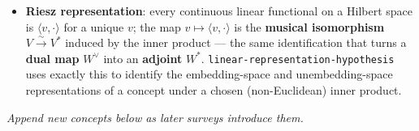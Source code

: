 \begin{itemize}
\item \textbf{Riesz representation}: every continuous linear functional on a Hilbert space is $\langle v,\cdot\rangle$ for a unique $v$; the map $v\mapsto\langle v,\cdot\rangle$ is the \textbf{musical isomorphism} $V\xrightarrow{\sim}V^{*}$ induced by the inner product --- the same identification that turns a \textbf{dual map} $W^{\vee}$ into an \textbf{adjoint} $W^{*}$. \texttt{linear-representation-hypothesis} uses exactly this to identify the embedding-space and unembedding-space representations of a concept under a chosen (non-Euclidean) inner product.
\end{itemize}


\emph{Append new concepts below as later surveys introduce them.}



\printbibliography

